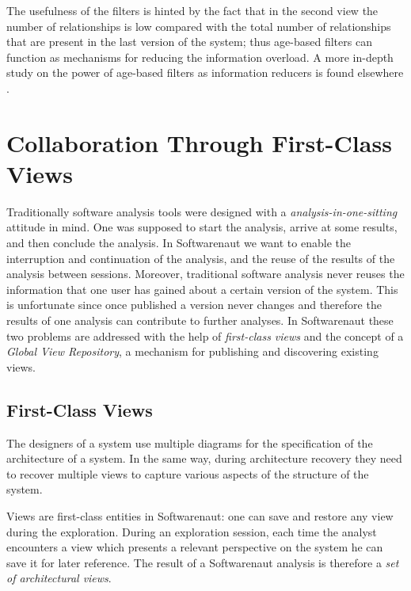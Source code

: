 \documentclass[preprint,12pt]{elsarticle}
\begin{document}
The usefulness of the filters is hinted by the fact that in the second view the number of relationships is low compared with the total number of relationships that are present in the last version of the system; thus age-based filters can function as mechanisms for reducing the information overload. A more in-depth study on the power of age-based filters as information reducers is found elsewhere \cite{lungu-relevo}.

\section {Collaboration Through First-Class Views} 

Traditionally software analysis tools were designed with a {\em analysis-in-one-sitting} attitude  in mind. One was supposed to start the analysis, arrive at some results, and then conclude the analysis. In Softwarenaut we want to enable the interruption and continuation of the analysis, and the reuse of the results of the analysis between sessions. Moreover, traditional software analysis never reuses the information that one user has gained about a certain version of the system. This is {unfortunate} since once published a version never changes and therefore the results of one analysis can {contribute to} further analyses. In Softwarenaut these two problems are addressed with the help of {\em first-class views} and the concept of a {\em Global View Repository}, a mechanism for publishing and discovering existing views.

\subsection {First-Class Views}

The designers of a system use multiple diagrams for the specification of the architecture of a system. In the same way, during architecture recovery they need to recover multiple views to capture various aspects of the structure of the system. 

Views are first-class entities in Softwarenaut: one can save and restore any view during the exploration. During an exploration session, each time the analyst encounters a view which presents a relevant perspective on the system he can save it for later reference. The result of a Softwarenaut analysis is therefore a {\em set of architectural views}.
\end{document}
